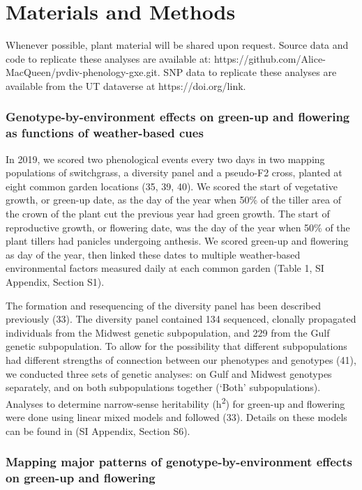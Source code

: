 \documentclass[
  9pt,
  twocolumn,
  twoside]{pnas-new}
\begin{document}
\section{Materials and Methods}\label{materials-and-methods}

Whenever possible, plant material will be shared upon request. Source
data and code to replicate these analyses are available at:
https://github.com/Alice-MacQueen/pvdiv-phenology-gxe.git. SNP data to
replicate these analyses are available from the UT dataverse at
https://doi.org/link.

\subsubsection{Genotype-by-environment effects on green-up and flowering
as functions of weather-based
cues}\label{genotype-by-environment-effects-on-green-up-and-flowering-as-functions-of-weather-based-cues}

In 2019, we scored two phenological events every two days in two mapping
populations of switchgrass, a diversity panel and a pseudo-F2 cross,
planted at eight common garden locations (35, 39, 40). We scored the
start of vegetative growth, or green-up date, as the day of the year
when 50\% of the tiller area of the crown of the plant cut the previous
year had green growth. The start of reproductive growth, or flowering
date, was the day of the year when 50\% of the plant tillers had
panicles undergoing anthesis. We scored green-up and flowering as day of
the year, then linked these dates to multiple weather-based
environmental factors measured daily at each common garden (Table 1, SI
Appendix, Section S1).

The formation and resequencing of the diversity panel has been described
previously (33). The diversity panel contained 134 sequenced, clonally
propagated individuals from the Midwest genetic subpopulation, and 229
from the Gulf genetic subpopulation. To allow for the possibility that
different subpopulations had different strengths of connection between
our phenotypes and genotypes (41), we conducted three sets of genetic
analyses: on Gulf and Midwest genotypes separately, and on both
subpopulations together (`Both' subpopulations). Analyses to determine
narrow-sense heritability (h\textsuperscript{2}) for green-up and
flowering were done using linear mixed models and followed (33). Details
on these models can be found in (SI Appendix, Section S6).

\subsubsection{Mapping major patterns of genotype-by-environment effects
on green-up and
flowering}\label{mapping-major-patterns-of-genotype-by-environment-effects-on-green-up-and-flowering}
\end{document}
